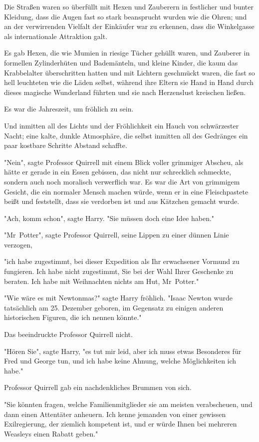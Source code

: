 {Die Straßen waren so überfüllt mit Hexen und Zauberern in festlicher und bunter Kleidung, dass die Augen fast so stark beansprucht wurden wie die Ohren; und an der verwirrenden Vielfalt der Einkäufer war zu erkennen, dass die Winkelgasse als internationale Attraktion galt.

Es gab Hexen, die wie Mumien in riesige Tücher gehüllt waren, und Zauberer in formellen Zylinderhüten und Bademänteln, und kleine Kinder, die kaum das Krabbelalter überschritten hatten und mit Lichtern geschmückt waren, die fast so hell leuchteten wie die Läden selbst, während ihre Eltern sie Hand in Hand durch dieses magische Wunderland führten und sie nach Herzenslust kreischen ließen.

Es war die Jahreszeit, um fröhlich zu sein.

Und inmitten all des Lichts und der Fröhlichkeit ein Hauch von schwärzester Nacht; eine kalte, dunkle Atmosphäre, die selbst inmitten all des Gedränges ein paar kostbare Schritte Abstand schaffte.

"Nein", sagte Professor Quirrell mit einem Blick voller grimmiger Abscheu, als hätte er gerade in ein Essen gebissen, das nicht nur schrecklich schmeckte, sondern auch noch moralisch verwerflich war. Es war die Art von grimmigem Gesicht, die ein normaler Mensch machen würde, wenn er in eine Fleischpastete beißt und feststellt, dass sie verdorben ist und aus Kätzchen gemacht wurde.

"Ach, komm schon", sagte Harry. "Sie müssen doch eine Idee haben."

"Mr~Potter", sagte Professor Quirrell, seine Lippen zu einer dünnen Linie verzogen,

"ich habe zugestimmt, bei dieser Expedition als Ihr erwachsener Vormund zu fungieren. Ich habe nicht zugestimmt, Sie bei der Wahl Ihrer Geschenke zu beraten. Ich habe mit Weihnachten nichts am Hut, Mr~Potter."

"Wie wäre es mit Newtonmas?" sagte Harry fröhlich. "Isaac Newton wurde tatsächlich am 25. Dezember geboren, im Gegensatz zu einigen anderen historischen Figuren, die ich nennen könnte."

Das beeindruckte Professor Quirrell nicht.

"Hören Sie", sagte Harry, "es tut mir leid, aber ich muss etwas Besonderes für Fred und George tun, und ich habe keine Ahnung, welche Möglichkeiten ich habe."

Professor Quirrell gab ein nachdenkliches Brummen von sich.

"Sie könnten fragen, welche Familienmitglieder sie am meisten verabscheuen, und dann einen Attentäter anheuern. Ich kenne jemanden von einer gewissen Exilregierung, der ziemlich kompetent ist, und er würde Ihnen bei mehreren Weasleys einen Rabatt geben."

}
